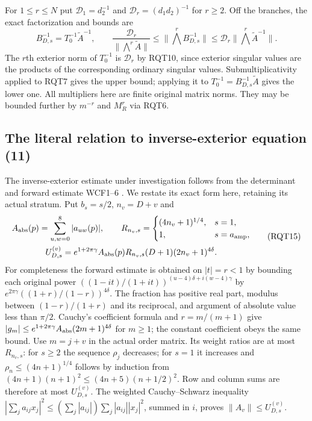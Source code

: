 \documentclass[11pt]{article}
\begin{document}
For $1\le r\le N$ put $\mathcal D_1=d_2^{-1}$ and
$\mathcal D_r=(d_1d_2)^{-1}$ for $r\ge2$.
Off the branches, the exact factorization and bounds are
\[
 B_{D,s}^{-1}=T_0^{-1}\widetilde A^{-1},\qquad
 \frac{\mathcal D_r}{\|\bigwedge^r\widetilde A\|}
 \le\|\bigwedge^r B_{D,s}^{-1}\|
 \le\mathcal D_r\|\bigwedge^r\widetilde A^{-1}\|.
 \tag{RQT14}
\]
The $r$th exterior norm of $T_0^{-1}$ is $\mathcal D_r$ by
RQT10, since exterior singular values are the products of the
corresponding ordinary singular values.  Submultiplicativity
applied to RQT7 gives the upper bound; applying it to
$T_0^{-1}=B_{D,s}^{-1}\widetilde A$ gives the lower one.
All multipliers here are finite original matrix norms.  They
may be bounded further by $m^{-r}$ and $M_R^r$ via RQT6.

\subsection{The literal relation to inverse-exterior equation (11)}
The inverse-exterior estimate under investigation follows from
the determinant and forward estimate WCF1--6 \cite{WCF}.
We restate its exact form here, retaining its actual stratum.
Put $b_s=s/2$, $n_v=D+v$ and
\[
\begin{gathered}
 A_{\rm abs}(p)=\sum_{u,w=0}^{8}|a_{uw}(p)|,\qquad
 R_{n_v,s}=\begin{cases}(4n_v+1)^{1/4},&s=1,\\1,&s=a_{\rm amp},\end{cases}\\
 U_{D,s}^{(v)}=e^{1+2\pi\gamma}A_{\rm abs}(p)
                 R_{n_v,s}(D+1)(2n_v+1)^{4\delta}.
\end{gathered}\tag{RQT15}
\]
For completeness the forward estimate is obtained on $|t|=r<1$
by bounding each original power
$((1-it)/(1+it))^{(u-4)\delta+i(w-4)\gamma}$ by
$e^{2\pi\gamma}((1+r)/(1-r))^{4\delta}$.
The fraction has positive real part, modulus between
$(1-r)/(1+r)$ and its reciprocal, and argument of absolute
value less than $\pi/2$.  Cauchy's coefficient formula and
$r=m/(m+1)$ give
$|g_m|\le e^{1+2\pi\gamma}A_{\rm abs}(2m+1)^{4\delta}$
for $m\ge1$; the constant coefficient obeys the same bound.
Use $m=j+v$ in the actual order matrix.  Its weight ratios
are at most $R_{n_v,s}$: for $s\ge2$ the sequence $\rho_j$
decreases; for $s=1$ it increases and
$\rho_n\le(4n+1)^{1/4}$ follows by induction from
$(4n+1)(n+1)^2\le(4n+5)(n+1/2)^2$.
Row and column sums are therefore at most $U_{D,s}^{(v)}$.
The weighted Cauchy--Schwarz inequality
$|\sum_j a_{ij}x_j|^2\le(\sum_j|a_{ij}|)
\sum_j|a_{ij}||x_j|^2$, summed in $i$, proves
$\|A_v\|\le U_{D,s}^{(v)}$.
\end{document}
